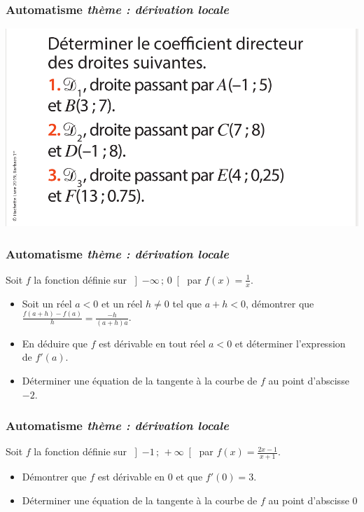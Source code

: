 \documentclass[11pt]{beamer}
\newcommand{\Interoo}[2]{\left]#1\, ;\, #2\right[}
\newcounter{autocompteur}
\newcommand{\automatisme}[1]{\addtocounter{autocompteur}{1}\frametitle{Automatisme  \theautocompteur  \textit{ thème : #1}}}
\begin{document}
\begin{frame}
\automatisme{dérivation locale}

\begin{center}
\includegraphics[scale=0.3]{ressources/deriv_locale3.png}
\end{center}

\end{frame}


\begin{frame}
\automatisme{dérivation locale}

Soit $f$ la fonction définie sur $\Interoo{-\infty}{0}$ par  $f(x)=\frac{1}{x}$.
\begin{itemize}
\item Soit un réel $a<0$ et un réel $h \neq 0$ tel que $a+h<0$, démontrer que $\frac{f(a+h)-f(a)}{h}=\frac{-h}{(a+h)a}$.
\item En déduire que $f$ est dérivable en tout réel $a<0$ et déterminer l'expression de $f'(a)$.
\item Déterminer une équation de la tangente à la courbe de $f$ au point d'abscisse $-2$.
\end{itemize}

\end{frame}




\begin{frame}
\automatisme{dérivation locale}

Soit $f$ la fonction définie sur $\Interoo{-1}{+\infty}$ par  $f(x)=\frac{2x-1}{x+1}$.
\begin{itemize}
\item Démontrer que $f$ est dérivable en $0$ et que $f'(0)=3$.
\item Déterminer une équation de la tangente à la courbe de $f$ au point d'abscisse $0$
\end{itemize}

\end{frame}
\end{document}
